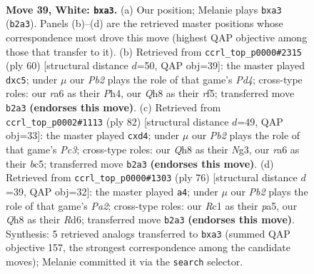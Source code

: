 \documentclass[11pt]{article}
\begin{document}
\clearpage

\begin{figure}[p]\centering
\begin{subfigure}{0.46\textwidth}\centering
\resizebox{\linewidth}{!}{%
\newchessgame
\chessboard[
  setfen={7Q/5k2/r4n2/1b1P4/8/p3p1p1/PPP3P1/2R1K3 w - - 0 39},
  showmover=false,
  pgfstyle=straightmove, color=movearrow, markmove={b2-a3}
]}
\caption{}
\end{subfigure}\hfill
\begin{subfigure}{0.46\textwidth}\centering
\resizebox{\linewidth}{!}{%
\newchessgame
\chessboard[
  setfen={5k2/pp6/6p1/2p2rPp/3P3P/P7/5P2/4R1K1 w - - 0 31},
  showmover=false,
  pgfstyle=straightmove, color=movearrow, markmove={d4-c5}
]}
\caption{}
\end{subfigure}
\\[4pt]
\begin{subfigure}{0.46\textwidth}\centering
\resizebox{\linewidth}{!}{%
\newchessgame
\chessboard[
  setfen={4r3/5p1k/p7/2b2p1P/P2p1P2/2P3N1/2K4R/8 w - - 0 42},
  showmover=false,
  pgfstyle=straightmove, color=movearrow, markmove={c3-d4}
]}
\caption{}
\end{subfigure}\hfill
\begin{subfigure}{0.46\textwidth}\centering
\resizebox{\linewidth}{!}{%
\newchessgame
\chessboard[
  setfen={5r2/6k1/3R1nP1/pp6/2p3P1/5P2/PPPK4/8 w - - 0 39},
  showmover=false,
  pgfstyle=straightmove, color=movearrow, markmove={a2-a4}
]}
\caption{}
\end{subfigure}
\caption{\textbf{Move 39, White: \texttt{bxa3}.} (a) Our position; Melanie plays \texttt{bxa3} (\texttt{b2a3}). Panels (b)--(d) are the retrieved master positions whose correspondence most drove this move (highest QAP objective among those that transfer to it). (b) Retrieved from \texttt{ccrl\_top\_p0000\#2315} (ply 60) [structural distance $d$=50, QAP obj=39]: the master played \texttt{dxc5}; under $\mu$ our \emph{Pb2} plays the role of that game's \emph{Pd4}; cross-type roles: our \emph{r}a6 as their \emph{P}h4, our \emph{Q}h8 as their \emph{r}f5; transferred move \texttt{b2a3} \textbf{(endorses this move)}. (c) Retrieved from \texttt{ccrl\_top\_p0002\#1113} (ply 82) [structural distance $d$=49, QAP obj=33]: the master played \texttt{cxd4}; under $\mu$ our \emph{Pb2} plays the role of that game's \emph{Pc3}; cross-type roles: our \emph{Q}h8 as their \emph{N}g3, our \emph{r}a6 as their \emph{b}c5; transferred move \texttt{b2a3} \textbf{(endorses this move)}. (d) Retrieved from \texttt{ccrl\_top\_p0000\#1303} (ply 76) [structural distance $d$=39, QAP obj=32]: the master played \texttt{a4}; under $\mu$ our \emph{Pb2} plays the role of that game's \emph{Pa2}; cross-type roles: our \emph{R}c1 as their \emph{p}a5, our \emph{Q}h8 as their \emph{R}d6; transferred move \texttt{b2a3} \textbf{(endorses this move)}. Synthesis: 5 retrieved analogs transferred to \texttt{bxa3} (summed QAP objective 157, the strongest correspondence among the candidate moves); Melanie committed it via the \texttt{search} selector.}
\label{fig:thought-m76}
\end{figure}
\end{document}
